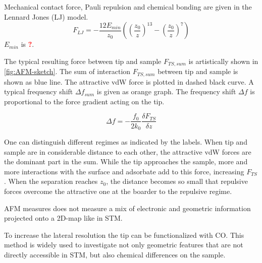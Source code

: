 Mechanical contact force, Pauli repulsion and chemical bonding are given in the Lennard Jones (LJ) model.\cite{jones_determination_1924}
\begin{equation} \label{eq:LJ}
 F_{LJ} = - \frac{12 E_{min}}{z_0} \left ( \left (\frac{z_0}{z} \right ) ^{13} - \left ( \frac{z_0}{z} \right )^7 \right )
\end{equation}
$E_{min}$ is \textcolor{red}{\textbf{?}}.

The typical resulting force between tip and sample $F_{TS,sum}$ is artistically shown in \autoref{fig:AFM-sketch}. 
The sum of interaction $F_{TS,sum}$ between tip and sample is shown as blue  line. The attractive vdW force is plotted in dashed black curve. A typical frequency shift $\Delta f_{sum}$ is given as orange graph. The frequency shift $\Delta f$ is proportional to the force gradient acting on the tip.

$$\Delta f = - \frac{f_0}{2k_0}\frac{\delta F_{TS}}{\delta z}$$

One can distinguish different regimes as indicated by the labels. When tip and sample are in considerable distance to each other, the attractive vdW forces are the dominant part in the sum. While the tip approaches the sample, more and more interactions with the surface and adsorbate add to this force, increasing $F_{TS}$. When the separation reaches $z_0$, the distance becomes so small that repulsive forces overcome the attractive one at the boarder to the repulsive regime.


AFM measures does not measure a mix of electronic and geometric information projected onto a 2D-map like in STM.

To increase the lateral resolution the tip can be functionalized with CO. This method is widely used \cite{albrecht_direct_2016, kawai_multiple_2018, kawai_atomically_2015, schulz_elemental_2018, gross_chemical_2009, pavlicek_generation_2017, schwarz_corrugation_2017} to investigate not only geometric features that are not directly accessible in STM, but also chemical differences on the sample.\cite{wang_exploration_2017}

